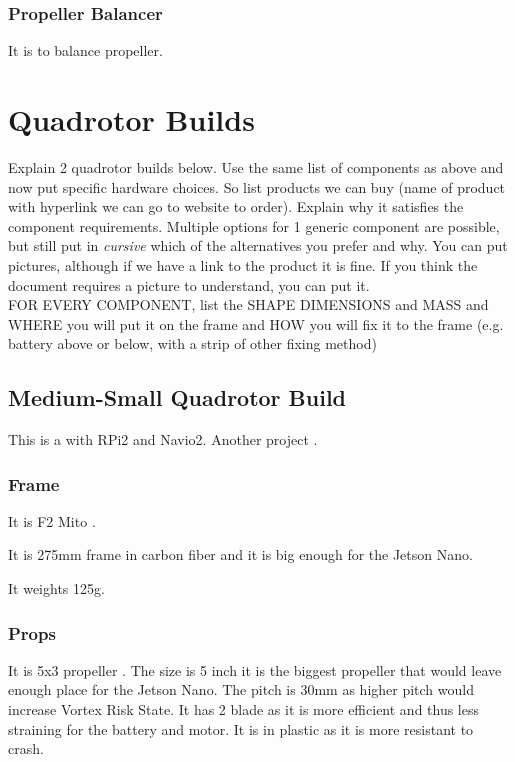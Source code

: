             \subsubsection{Propeller Balancer}
                It is to balance propeller.
    
    \newpage
    \section{Quadrotor Builds}
        Explain 2 quadrotor builds below. Use the same list of components as above and now put specific hardware choices. So list products we can buy (name of product with hyperlink we can go to website to order). Explain why it satisfies the component requirements. Multiple options for 1 generic component are possible, but still put in \textit{cursive} which of the alternatives you prefer and why. You can put pictures, although if we have a link to the product it is fine. If you think the document requires a picture to understand, you can put it.\\
        FOR EVERY COMPONENT, list the SHAPE DIMENSIONS and MASS and WHERE you will put it on the frame and HOW you will fix it to the frame (e.g. battery above or below, with a strip of other fixing method)
        \subsection{Medium-Small Quadrotor Build}
        
        
            This is a \cite{hackaday_navio} with RPi2 and Navio2.
            Another project \cite{instructables_navio}.



            \subsubsection{Frame}
                It is F2 Mito \cite{bangood_f2_mito}.
            
                It is 275mm frame in carbon fiber and it is big enough for the Jetson Nano.
            
                It weights 125g.
            
            \subsubsection{Props}
                It is 5x3 propeller \cite{bangood_propeller}. The size is 5 inch it is the biggest propeller that would leave enough place for the Jetson Nano. The pitch is 30mm as higher pitch would increase Vortex Risk State. It has 2 blade as it is more efficient and thus less straining for the battery and motor. It is in plastic as it is more resistant to crash.
                
